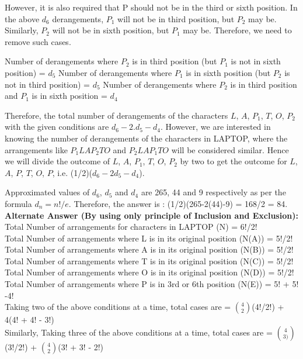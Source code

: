 \documentclass[a4paper]{article}
\begin{document}
\begin{enumerate}
However, it is also required that P should not be in the third or sixth position. In the above $d_6$ derangements, $P_1$ will not be in third position, but $P_2$ may be. Similarly, $P_2$ will not be in sixth position, but $P_1$ may be. Therefore, we need to remove such cases.

Number of derangements where $P_2$ is in third position (but $P_1$ is not in sixth position) = $d_5$
Number of derangements where $P_1$ is in sixth position (but $P_2$ is not in third position) = $d_5$
Number of derangements where $P_2$ is in third position and $P_1$ is in sixth position = $d_4$

Therefore, the total number of derangements of the characters $L$, $A$, $P_1$, $T$, $O$, $P_2$ with the given conditions are $d_6 - 2.d_5 - d_4$.
However, we are interested in knowing the number of derangements of the characters in LAPTOP, where the arrangements like $P_1 L A P_2 T O$ and $P_2 L A P_1 T O$ will be considered similar. Hence we will divide the outcome of $L$, $A$, $P_1$, $T$, $O$, $P_2$ by two to get the outcome for $L$, $A$, $P$, $T$, $O$, $P$, i.e. (1/2)($d_6 - 2d_5 - d_4$).    

Approximated values of $d_6$, $d_5$ and $d_4$ are 265, 44 and 9 respectively as per the formula $d_n = n!/e$. Therefore, the answer is : (1/2)(265-2(44)-9) = 168/2 = 84.\\

\textbf{Alternate Answer (By using only principle of Inclusion and Exclusion):}\\
Total Number of arrangements for characters in LAPTOP (N) = 6!/2!\\

Total Number of arrangements where L is in its original position (N(A)) = 5!/2!\\
Total Number of arrangements where A is in its original position (N(B)) = 5!/2!\\
Total Number of arrangements where T is in its original position (N(C)) = 5!/2!\\
Total Number of arrangements where O is in its original position (N(D)) = 5!/2!\\
Total Number of arrangements where P is in 3rd or 6th position (N(E)) = 5! + 5! -4!\\

Taking two of the above conditions at a time, total cases are = $4 \choose 2$(4!/2!) + 4(4! + 4! - 3!)\\

Similarly, Taking three of the above conditions at a time, total cases are = $4 \choose 3)$ (3!/2!) + $4 \choose 2$(3! + 3! - 2!) \\


\end{enumerate}
\end{document}
